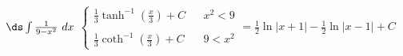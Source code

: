 {$\ds \int \frac{1}{9-x^2}\ dx$}
{$\left\{\begin{array}{ccc} \frac13\tanh^{-1}\left(\frac x3\right)+C & & x^2<9 \\ \\
\frac13\coth^{-1}\left(\frac x3\right)+C & & 9<x^2 \end{array}\right. = \frac12\ln |x+1| - \frac12\ln |x-1|+C$}
